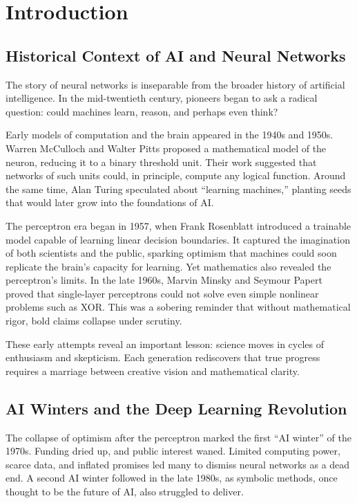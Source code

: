 ﻿\chapter{Introduction}

\section{Historical Context of AI and Neural Networks}

The story of neural networks is inseparable from the broader history of artificial intelligence. In the mid-twentieth century, pioneers began to ask a radical question: could machines learn, reason, and perhaps even think?

Early models of computation and the brain appeared in the 1940s and 1950s. Warren McCulloch and Walter Pitts proposed a mathematical model of the neuron, reducing it to a binary threshold unit. Their work suggested that networks of such units could, in principle, compute any logical function. Around the same time, Alan Turing speculated about ``learning machines,'' planting seeds that would later grow into the foundations of AI.

The perceptron era began in 1957, when Frank Rosenblatt introduced a trainable model capable of learning linear decision boundaries. It captured the imagination of both scientists and the public, sparking optimism that machines could soon replicate the brain’s capacity for learning. Yet mathematics also revealed the perceptron’s limits. In the late 1960s, Marvin Minsky and Seymour Papert proved that single-layer perceptrons could not solve even simple nonlinear problems such as XOR. This was a sobering reminder that without mathematical rigor, bold claims collapse under scrutiny.

These early attempts reveal an important lesson: science moves in cycles of enthusiasm and skepticism. Each generation rediscovers that true progress requires a marriage between creative vision and mathematical clarity.

\section{AI Winters and the Deep Learning Revolution}

The collapse of optimism after the perceptron marked the first ``AI winter'' of the 1970s. Funding dried up, and public interest waned. Limited computing power, scarce data, and inflated promises led many to dismiss neural networks as a dead end. A second AI winter followed in the late 1980s, as symbolic methods, once thought to be the future of AI, also struggled to deliver.

